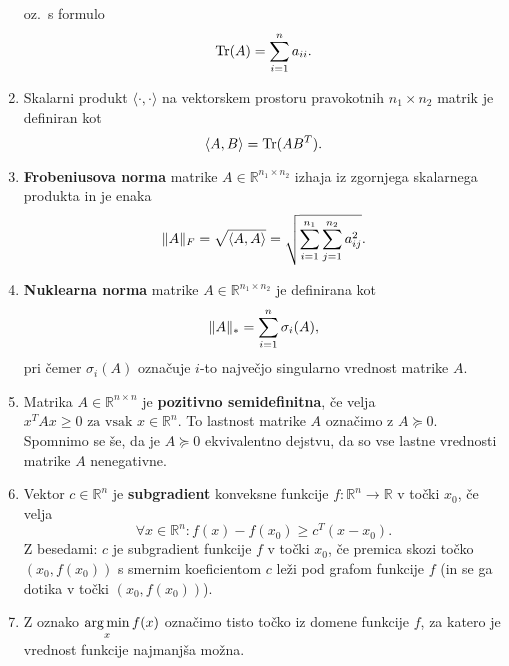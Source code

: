 \begin{enumerate}
        oz.\ s formulo
        \[
          \operatorname{Tr}(A) = \sum_{i = 1}^{n} a_{ii}.
        \]
  \item Skalarni produkt
        $\langle\cdot,\cdot\rangle$ na vektorskem prostoru pravokotnih $n_1\times n_2$ matrik je definiran kot \[
          \langle A, B \rangle = \operatorname{Tr}(AB^T).
        \]
  \item \textbf{Frobeniusova norma} matrike $A \in \mathbb{R}^{n_1 \times n_2}$ izhaja iz zgornjega skalarnega produkta in je enaka \[
          \lVert A\rVert_F =
          \sqrt{\langle A, A \rangle}=
          \sqrt{\sum_{i = 1}^{n_1} \sum_{j = 1}^{n_2} a_{ij}^2}.
        \]
  \item \textbf{Nuklearna norma} matrike $A\in \mathbb R^{n_1\times n_2}$ je definirana kot \[
          \lVert A\rVert_* = \sum_{i = 1}^{n} \sigma_i(A),
        \] pri čemer $\sigma_i(A)$ označuje $i$-to največjo singularno vrednost matrike $A$.
  \item Matrika $A \in \mathbb{R}^{n \times n}$ je \textbf{pozitivno semidefinitna}, če velja $x^TAx \ge 0 \text{ za vsak } x \in \mathbb{R}^n$. To lastnost matrike $A$ označimo z $A \succeq 0$.
        Spomnimo se še, da je $A \succeq 0$ ekvivalentno dejstvu, da so vse  lastne vrednosti matrike $A$ nenegativne.
  \item Vektor $c\in \mathbb R^n$ je \textbf{subgradient} konveksne funkcije $f: \mathbb{R}^n \rightarrow \mathbb{R}$ v točki $x_0$, če velja
        \[
          \forall x\in\mathbb R^n: f(x) - f(x_0) \geq c^T(x - x_0).
        \]
        Z besedami: $c$ je subgradient funkcije $f$ v točki $x_0$, če premica skozi točko $(x_0,f(x_0))$ s smernim koeficientom $c$ leži pod grafom funkcije $f$ (in se ga dotika v točki $(x_0,f(x_0))$).
  \item Z oznako
        $\displaystyle\operatorname*{arg\,min}_x f(x)$
        označimo tisto točko iz domene funkcije $f$, za katero je vrednost funkcije najmanjša možna.
\end{enumerate}






